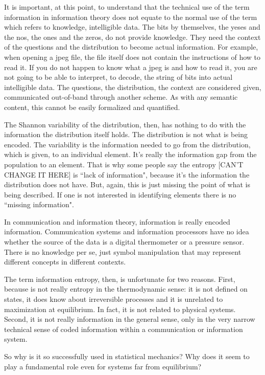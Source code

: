 \documentclass{article}
\begin{document}
It is important, at this point, to understand that the technical use of the term information in information theory does not equate to the normal use of the term which refers to knowledge, intelligible data. The bits by themselves, the yeses and the nos, the ones and the zeros, do not provide knowledge. They need the context of the questions and the distribution to become actual information. For example, when opening a jpeg file, the file itself does not contain the instructions of how to read it. If you do not happen to know what a jpeg is and how to read it, you are not going to be able to interpret, to decode, the string of bits into actual intelligible data. The questions, the distribution, the context are considered given, communicated out-of-band through another scheme. As with any semantic content, this cannot be easily formalized and quantified.

The Shannon variability of the distribution, then, has nothing to do with the information the distribution itself holds. The distribution is not what is being encoded. The variability is the information needed to go from the distribution, which is given, to an individual element. It's really the information gap from the population to an element. That is why some people say the entropy [CAN'T CHANGE IT HERE] is ``lack of information", because it's the information the distribution does not have. But, again, this is just missing the point of what is being described. If one is not interested in identifying elements there is no ``missing information".

In communication and information theory, information is really encoded information. Communication systems and information processors have no idea whether the source of the data is a digital thermometer or a pressure sensor. There is no knowledge per se, just symbol manipulation that may represent different concepts in different contexts.

The term information entropy, then, is unfortunate for two reasons. First, because is not really entropy in the thermodynamic sense: it is not defined on states, it does know about irreversible processes and it is unrelated to maximization at equilibrium. In fact, it is not related to physical systems. Second, it is not really information in the general sense, only in the very narrow technical sense of coded information within a communication or information system.

So why is it so successfully used in statistical mechanics? Why does it seem to play a fundamental role even for systems far from equilibrium?
\end{document}
